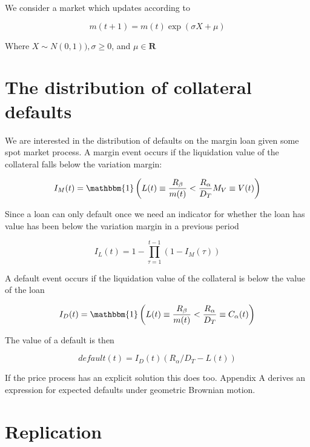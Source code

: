 \documentclass[12pt]{article}
\begin{document}
We consider a market which updates according to 

\[ m(t+1) = m(t)\exp( \sigma X + \mu) \]

Where $X \sim N(0,1)), \sigma \geq 0$, and  $\mu \in \mathbf{R}$

\section{The distribution of collateral defaults}

We are interested in the distribution of defaults on the margin loan given some spot market process. A margin event occurs if the liquidation value of the collateral falls below the variation margin:

\begin{equation*}
\label{IM}
    I_M(t) = \mathbbm{1} \left( L(t) \equiv \frac{R_\beta}{m(t)} < \frac{R_\alpha}{D_T} M_V \equiv V(t) \right)
\end{equation*}

Since a loan can only default once we need an indicator for whether the loan has value has been below the variation margin in a previous period

\begin{equation*} \label{IL}
    I_L(t) = 1-\prod_{\tau=1}^{t-1} \left(1-I_M(\tau) \right)
\end{equation*}

A default event occurs if the liquidation value of the collateral is below the value of the loan

\begin{equation*} \label{ID}
    I_D(t) = \mathbbm{1} \left( L(t) \equiv \frac{R_\beta}{m(t)} < \frac{R_\alpha}{D_T}  \equiv C_\alpha(t)\right)
\end{equation*}

The value of a default is then

\begin{equation}
 default(t) =   I_D(t) ( R_\alpha / D_T - L(t))
\end{equation}



If the price process has an explicit solution this does too. Appendix A derives an expression for expected defaults under geometric Brownian motion.


\section{Replication}
\end{document}
